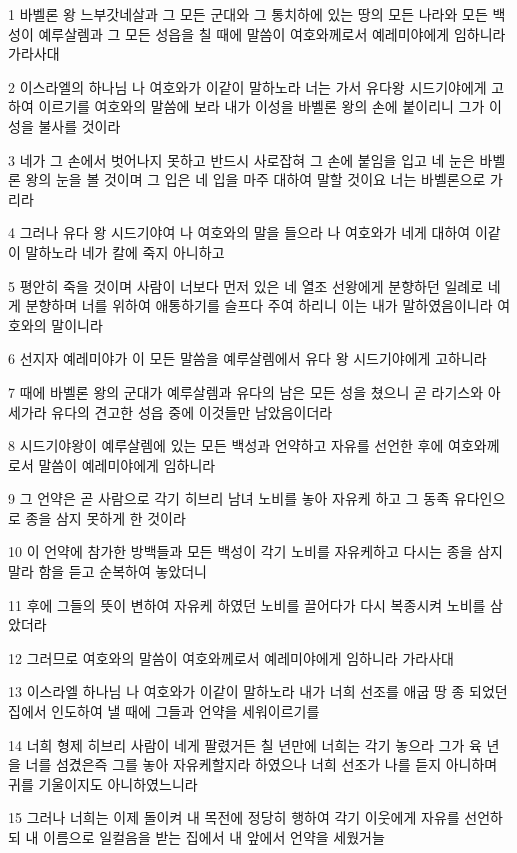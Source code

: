 \par 1 바벨론 왕 느부갓네살과 그 모든 군대와 그 통치하에 있는 땅의 모든 나라와 모든 백성이 예루살렘과 그 모든 성읍을 칠 때에 말씀이 여호와께로서 예레미야에게 임하니라 가라사대
\par 2 이스라엘의 하나님 나 여호와가 이같이 말하노라 너는 가서 유다왕 시드기야에게 고하여 이르기를 여호와의 말씀에 보라 내가 이성을 바벨론 왕의 손에 붙이리니 그가 이 성을 불사를 것이라
\par 3 네가 그 손에서 벗어나지 못하고 반드시 사로잡혀 그 손에 붙임을 입고 네 눈은 바벨론 왕의 눈을 볼 것이며 그 입은 네 입을 마주 대하여 말할 것이요 너는 바벨론으로 가리라
\par 4 그러나 유다 왕 시드기야여 나 여호와의 말을 들으라 나 여호와가 네게 대하여 이같이 말하노라 네가 칼에 죽지 아니하고
\par 5 평안히 죽을 것이며 사람이 너보다 먼저 있은 네 열조 선왕에게 분향하던 일례로 네게 분향하며 너를 위하여 애통하기를 슬프다 주여 하리니 이는 내가 말하였음이니라 여호와의 말이니라
\par 6 선지자 예레미야가 이 모든 말씀을 예루살렘에서 유다 왕 시드기야에게 고하니라
\par 7 때에 바벨론 왕의 군대가 예루살렘과 유다의 남은 모든 성을 쳤으니 곧 라기스와 아세가라 유다의 견고한 성읍 중에 이것들만 남았음이더라
\par 8 시드기야왕이 예루살렘에 있는 모든 백성과 언약하고 자유를 선언한 후에 여호와께로서 말씀이 예레미야에게 임하니라
\par 9 그 언약은 곧 사람으로 각기 히브리 남녀 노비를 놓아 자유케 하고 그 동족 유다인으로 종을 삼지 못하게 한 것이라
\par 10 이 언약에 참가한 방백들과 모든 백성이 각기 노비를 자유케하고 다시는 종을 삼지 말라 함을 듣고 순복하여 놓았더니
\par 11 후에 그들의 뜻이 변하여 자유케 하였던 노비를 끌어다가 다시 복종시켜 노비를 삼았더라
\par 12 그러므로 여호와의 말씀이 여호와께로서 예레미야에게 임하니라 가라사대
\par 13 이스라엘 하나님 나 여호와가 이같이 말하노라 내가 너희 선조를 애굽 땅 종 되었던 집에서 인도하여 낼 때에 그들과 언약을 세워이르기를
\par 14 너희 형제 히브리 사람이 네게 팔렸거든 칠 년만에 너희는 각기 놓으라 그가 육 년을 너를 섬겼은즉 그를 놓아 자유케할지라 하였으나 너희 선조가 나를 듣지 아니하며 귀를 기울이지도 아니하였느니라
\par 15 그러나 너희는 이제 돌이켜 내 목전에 정당히 행하여 각기 이웃에게 자유를 선언하되 내 이름으로 일컬음을 받는 집에서 내 앞에서 언약을 세웠거늘
